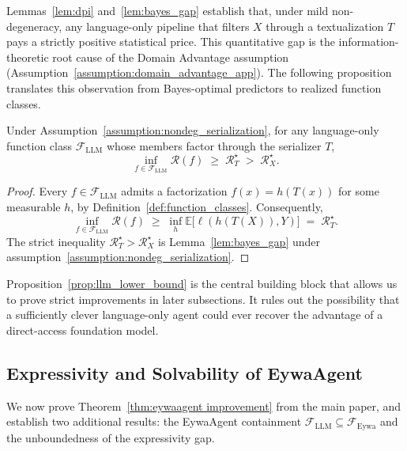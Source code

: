 Lemmas~\ref{lem:dpi} and~\ref{lem:bayes_gap} establish that, under mild non-degeneracy, any language-only pipeline that filters $X$ through a textualization $T$ pays a strictly positive statistical price. This quantitative gap is the information-theoretic root cause of the Domain Advantage assumption (Assumption~\ref{assumption:domain_advantage_app}). The following proposition translates this observation from Bayes-optimal predictors to realized function classes.

\begin{proposition}
\label{prop:llm_lower_bound}
Under Assumption~\ref{assumption:nondeg_serialization}, for any language-only function class $\mathcal{F}_{\mathrm{LLM}}$ whose members factor through the serializer $T$,
\begin{equation}
\inf_{f\in\mathcal{F}_{\mathrm{LLM}}}\mathcal{R}(f)\;\ge\;\mathcal{R}_T^\star\;>\;\mathcal{R}_X^\star.
\end{equation}
\end{proposition}
\begin{proof}
Every $f\in\mathcal{F}_{\mathrm{LLM}}$ admits a factorization $f(x)=h(T(x))$ for some measurable $h$, by Definition~\ref{def:function_classes}. Consequently,
\[
\inf_{f\in\mathcal{F}_{\mathrm{LLM}}}\mathcal{R}(f)
\;\ge\;
\inf_{h}\mathbb{E}\big[\ell(h(T(X)),Y)\big]
\;=\;
\mathcal{R}_T^\star.
\]
The strict inequality $\mathcal{R}_T^\star>\mathcal{R}_X^\star$ is Lemma~\ref{lem:bayes_gap} under assumption~\ref{assumption:nondeg_serialization}.
\end{proof}
Proposition~\ref{prop:llm_lower_bound} is the central building block that allows us to prove strict improvements in later subsections. It rules out the possibility that a sufficiently clever language-only agent could ever recover the advantage of a direct-access foundation model.






\subsection{Expressivity and Solvability of EywaAgent}
\label{app:expressivity}

We now prove Theorem~\ref{thm:eywaagent improvement} from the main paper, and establish two additional results: the EywaAgent containment $\mathcal{F}_{\mathrm{LLM}}\subseteq\mathcal{F}_{\mathrm{Eywa}}$ and the unboundedness of the expressivity gap.

